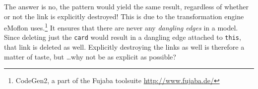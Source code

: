 The answer is no, the pattern would yield the same result, regardless of whether or not the link is explicitly destroyed! This is due to
the transformation engine eMoflon uses.\footnote{CodeGen2, a part of the Fujaba toolsuite \url{http://www.fujaba.de/}} It ensures that
there are never any \emph{dangling edges} in a model. Since deleting just the \texttt{card} would result in a dangling edge attached to \texttt{this}, that
link is deleted as well. Explicitly destroying the links as well is therefore a matter of taste, but \ldots why not be as explicit as possible?





